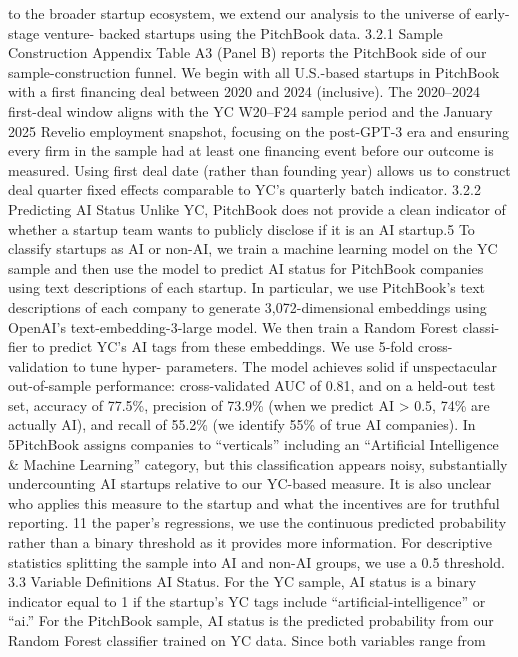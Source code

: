 to the broader startup ecosystem, we extend our analysis to the universe of early-stage venture-
backed startups using the PitchBook data.
3.2.1
Sample Construction
Appendix Table A3 (Panel B) reports the PitchBook side of our sample-construction funnel. We
begin with all U.S.-based startups in PitchBook with a first financing deal between 2020 and 2024
(inclusive). The 2020–2024 first-deal window aligns with the YC W20–F24 sample period and the
January 2025 Revelio employment snapshot, focusing on the post-GPT-3 era and ensuring every
firm in the sample had at least one financing event before our outcome is measured. Using first
deal date (rather than founding year) allows us to construct deal quarter fixed effects comparable
to YC’s quarterly batch indicator.
3.2.2
Predicting AI Status
Unlike YC, PitchBook does not provide a clean indicator of whether a startup team wants to publicly
disclose if it is an AI startup.5 To classify startups as AI or non-AI, we train a machine learning
model on the YC sample and then use the model to predict AI status for PitchBook companies
using text descriptions of each startup.
In particular, we use PitchBook’s text descriptions of each company to generate 3,072-dimensional
embeddings using OpenAI’s text-embedding-3-large model. We then train a Random Forest classi-
fier to predict YC’s AI tags from these embeddings. We use 5-fold cross-validation to tune hyper-
parameters. The model achieves solid if unspectacular out-of-sample performance: cross-validated
AUC of 0.81, and on a held-out test set, accuracy of 77.5\%, precision of 73.9\% (when we predict
AI > 0.5, 74\% are actually AI), and recall of 55.2\% (we identify 55\% of true AI companies). In
5PitchBook assigns companies to “verticals” including an “Artificial Intelligence \& Machine Learning” category, but
this classification appears noisy, substantially undercounting AI startups relative to our YC-based measure. It is
also unclear who applies this measure to the startup and what the incentives are for truthful reporting.
11
the paper’s regressions, we use the continuous predicted probability rather than a binary threshold
as it provides more information. For descriptive statistics splitting the sample into AI and non-AI
groups, we use a 0.5 threshold.
3.3
Variable Definitions
AI Status.
For the YC sample, AI status is a binary indicator equal to 1 if the startup’s YC
tags include “artificial-intelligence” or “ai.” For the PitchBook sample, AI status is the predicted
probability from our Random Forest classifier trained on YC data. Since both variables range from
